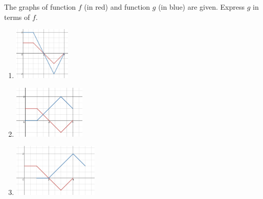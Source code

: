 \documentclass{ximera}
\begin{document}
\begin{problem}\label{prob:160hom3prob2}
The graphs of function $f$ (in red) and function $g$ (in blue) are given. Express $g$ in terms of $f$.
\begin{enumerate}
    \item \begin{image}
   \includegraphics[height=1in]{160H3pic4.jpg}
 \end{image}
 \begin{multipleChoice}  
  \end{multipleChoice}
  
   \item \begin{image}
   \includegraphics[height=1in]{160H3pic2.jpg}
 \end{image}
 \begin{multipleChoice}  
  \end{multipleChoice}
  
  \item \begin{image}
   \includegraphics[height=1in]{160H3pic3.jpg}
 \end{image}
 \begin{multipleChoice}  
  \end{multipleChoice}
\end{enumerate}
\end{problem}
\end{document}
